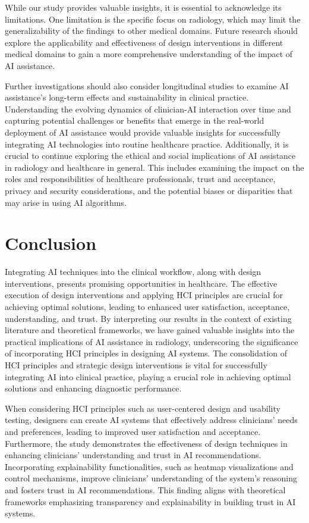 While our study provides valuable insights, it is essential to acknowledge its limitations.
One limitation is the specific focus on radiology, which may limit the generalizability of the findings to other medical domains.
Future research should explore the applicability and effectiveness of design interventions in different medical domains to gain a more comprehensive understanding of the impact of \ac{AI} assistance.

Further investigations should also consider longitudinal studies to examine \ac{AI} assistance's long-term effects and sustainability in clinical practice.
Understanding the evolving dynamics of clinician-\ac{AI} interaction over time and capturing potential challenges or benefits that emerge in the real-world deployment of \ac{AI} assistance would provide valuable insights for successfully integrating \ac{AI} technologies into routine healthcare practice.
Additionally, it is crucial to continue exploring the ethical and social implications of \ac{AI} assistance in radiology and healthcare in general.
This includes examining the impact on the roles and responsibilities of healthcare professionals, trust and acceptance, privacy and security considerations, and the potential biases or disparities that may arise in using \ac{AI} algorithms.

\section{Conclusion}
\label{sec:chap005008}

Integrating \ac{AI} techniques into the clinical workflow, along with design interventions, presents promising opportunities in healthcare.
The effective execution of design interventions and applying \ac{HCI} principles are crucial for achieving optimal solutions, leading to enhanced user satisfaction, acceptance, understanding, and trust.
By interpreting our results in the context of existing literature and theoretical frameworks, we have gained valuable insights into the practical implications of \ac{AI} assistance in radiology, underscoring the significance of incorporating \ac{HCI} principles in designing \ac{AI} systems.
The consolidation of \ac{HCI} principles and strategic design interventions is vital for successfully integrating \ac{AI} into clinical practice, playing a crucial role in achieving optimal solutions and enhancing diagnostic performance.

When considering \ac{HCI} principles such as user-centered design and usability testing, designers can create \ac{AI} systems that effectively address clinicians' needs and preferences, leading to improved user satisfaction and acceptance.
Furthermore, the study demonstrates the effectiveness of design techniques in enhancing clinicians' understanding and trust in \ac{AI} recommendations.
Incorporating explainability functionalities, such as heatmap visualizations and control mechanisms, improve clinicians' understanding of the system's reasoning and fosters trust in \ac{AI} recommendations.
This finding aligns with theoretical frameworks emphasizing transparency and explainability in building trust in \ac{AI} systems.

